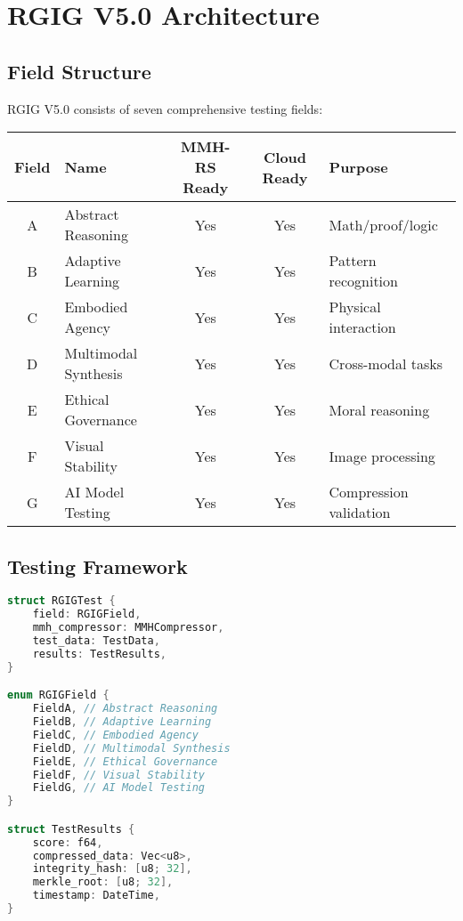\documentclass[12pt,a4paper]{article}
\begin{document}
\newpage

\section{RGIG V5.0 Architecture}

\subsection{Field Structure}
RGIG V5.0 consists of seven comprehensive testing fields:

\begin{center}
\begin{tabular}{|c|l|c|c|l|}
\hline
Field & Name & MMH-RS Ready & Cloud Ready & Purpose \\
\hline
A & Abstract Reasoning & Yes & Yes & Math/proof/logic \\
B & Adaptive Learning & Yes & Yes & Pattern recognition \\
C & Embodied Agency & Yes & Yes & Physical interaction \\
D & Multimodal Synthesis & Yes & Yes & Cross-modal tasks \\
E & Ethical Governance & Yes & Yes & Moral reasoning \\
F & Visual Stability & Yes & Yes & Image processing \\
G & AI Model Testing & Yes & Yes & Compression validation \\
\hline
\end{tabular}
\end{center}

\subsection{Testing Framework}
\begin{lstlisting}[language=C, caption=RGIG Testing Framework]
struct RGIGTest {
    field: RGIGField,
    mmh_compressor: MMHCompressor,
    test_data: TestData,
    results: TestResults,
}

enum RGIGField {
    FieldA, // Abstract Reasoning
    FieldB, // Adaptive Learning
    FieldC, // Embodied Agency
    FieldD, // Multimodal Synthesis
    FieldE, // Ethical Governance
    FieldF, // Visual Stability
    FieldG, // AI Model Testing
}

struct TestResults {
    score: f64,
    compressed_data: Vec<u8>,
    integrity_hash: [u8; 32],
    merkle_root: [u8; 32],
    timestamp: DateTime,
}
\end{lstlisting}
\end{document}
